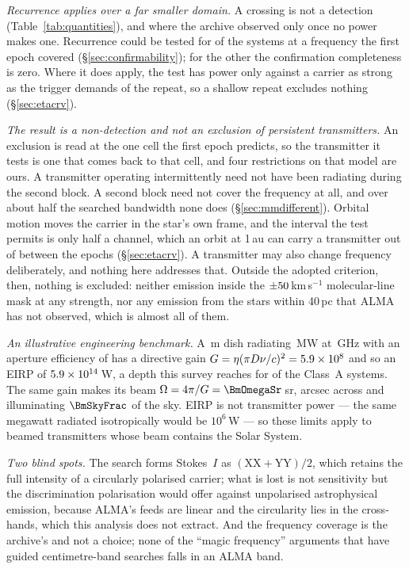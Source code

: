 \noindent\emph{Recurrence applies over a far smaller domain.} A
crossing is not a detection (Table~\ref{tab:quantities}), and where the archive
observed only once no power makes one. Recurrence could be tested for
\RcConfSysDay{} of the \NSysClassA{} systems at a frequency the first epoch
covered (\S\ref{sec:confirmability}); for the other \RcNoRepSys{} the
confirmation completeness is zero. Where it does apply, the test has power
only against a carrier as strong as the trigger demands of the repeat, so a
shallow repeat excludes nothing (\S\ref{sec:etacrv}).

\noindent\emph{The result is a non-detection and not an exclusion of
persistent transmitters.} An exclusion is read at the one cell the first
epoch predicts, so the transmitter it tests is one that comes back to that
cell, and four restrictions on that model are
ours. A transmitter operating intermittently need not have been radiating
during the second block. A second block need not cover the frequency at all,
and over about half the searched bandwidth none does
(\S\ref{sec:mmdifferent}). Orbital motion moves the carrier in the star's own
frame, and the interval the test permits is only half a channel, which an
orbit at 1\,au can carry a transmitter out of between the epochs
(\S\ref{sec:etacrv}). A transmitter may also change frequency deliberately,
and nothing here addresses that. Outside the adopted criterion, then, nothing
is excluded: neither emission inside the
$\pm50$\,km\,s$^{-1}$ molecular-line mask at any strength, nor any
emission from the \NGaiaCensus{} stars within 40\,pc that ALMA has not
observed, which is almost all of them.

\noindent\emph{An illustrative engineering benchmark.} A \BenchDiam\,m dish
radiating \BenchPowerMW\,MW at \BenchFreqGHz\,GHz with an aperture efficiency
of \BenchEta{} has a directive gain $G=\eta(\pi D\nu/c)^{2}=5.9\times10^{8}$ and so
an EIRP of $5.9\times10^{14}$\,W, a depth this survey reaches for \BenchNSysA{} of
the \NSysClassA{} Class~A systems. The same gain makes its beam
$\Omega=4\pi/G=\BmOmegaSr$\,sr, \BmArcsec{} arcsec across and illuminating
$\BmSkyFrac$ of the sky. EIRP is not transmitter power --- the same megawatt
radiated isotropically would be $10^{6}$\,W --- so these limits apply to
beamed transmitters whose beam contains the Solar System.

\noindent\emph{Two blind spots.} The search forms Stokes~$I$ as
$(\mathrm{XX}+\mathrm{YY})/2$, which retains the full intensity of a circularly polarised
carrier; what is lost is not sensitivity but the discrimination polarisation
would offer against unpolarised astrophysical emission, because ALMA's feeds
are linear and the circularity lies in the cross-hands, which this analysis
does not extract. And the frequency coverage is the archive's and not a choice; none
of the ``magic frequency'' arguments that have guided centimetre-band searches
falls in an ALMA band.


